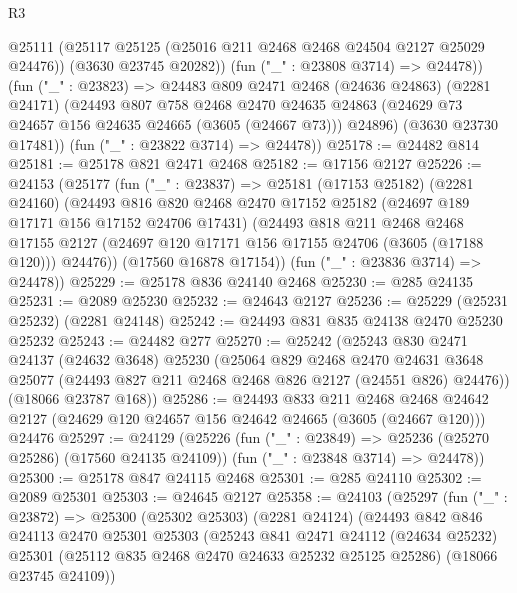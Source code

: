 \begin{lexlean}{R3}
\begin{coremodule}
        @25111
          (@25117 @25125 (@25016 @211 @2468 @2468 @24504 @2127 @25029 @24476))
          (@3630 @23745 @20282))
        (fun ("_" : @23808 @3714) => @24478))
      (fun ("_" : @23823) =>
      @24483
        @809
        @2471
        @2468
        (@24636 @24863)
        (@2281 @24171)
        (@24493
          @807
          @758
          @2468
          @2470
          @24635
          @24863
          (@24629 @73 @24657 @156 @24635 @24665 (@3605 (@24667 @73)))
          @24896)
        (@3630 @23730 @17481))
      (fun ("_" : @23822 @3714) => @24478))
@25178 := @24482 @814
@25181 := @25178 @821 @2471 @2468
@25182 := @17156 @2127
@25226 := @24153
    (@25177
      (fun ("_" : @23837) =>
      @25181
        (@17153 @25182)
        (@2281 @24160)
        (@24493
          @816
          @820
          @2468
          @2470
          @17152
          @25182
          (@24697 @189 @17171 @156 @17152 @24706 @17431)
          (@24493
            @818
            @211
            @2468
            @2468
            @17155
            @2127
            (@24697 @120 @17171 @156 @17155 @24706 (@3605 (@17188 @120)))
            @24476))
        (@17560 @16878 @17154))
      (fun ("_" : @23836 @3714) => @24478))
@25229 := @25178 @836 @24140 @2468
@25230 := @285 @24135
@25231 := @2089 @25230
@25232 := @24643 @2127
@25236 := @25229 (@25231 @25232) (@2281 @24148)
@25242 := @24493 @831 @835 @24138 @2470 @25230 @25232
@25243 := @24482 @277
@25270 := @25242
    (@25243
      @830
      @2471
      @24137
      (@24632 @3648)
      @25230
      (@25064
        @829
        @2468
        @2470
        @24631
        @3648
        @25077
        (@24493 @827 @211 @2468 @2468 @826 @2127 (@24551 @826) @24476))
      (@18066 @23787 @168))
@25286 := @24493
    @833
    @211
    @2468
    @2468
    @24642
    @2127
    (@24629 @120 @24657 @156 @24642 @24665 (@3605 (@24667 @120)))
    @24476
@25297 := @24129
    (@25226
      (fun ("_" : @23849) => @25236 (@25270 @25286) (@17560 @24135 @24109))
      (fun ("_" : @23848 @3714) => @24478))
@25300 := @25178 @847 @24115 @2468
@25301 := @285 @24110
@25302 := @2089 @25301
@25303 := @24645 @2127
@25358 := @24103
    (@25297
      (fun ("_" : @23872) =>
      @25300
        (@25302 @25303)
        (@2281 @24124)
        (@24493
          @842
          @846
          @24113
          @2470
          @25301
          @25303
          (@25243
            @841
            @2471
            @24112
            (@24634 @25232)
            @25301
            (@25112 @835 @2468 @2470 @24633 @25232 @25125 @25286)
            (@18066 @23745 @24109))

\end{coremodule}
\end{lexlean}
